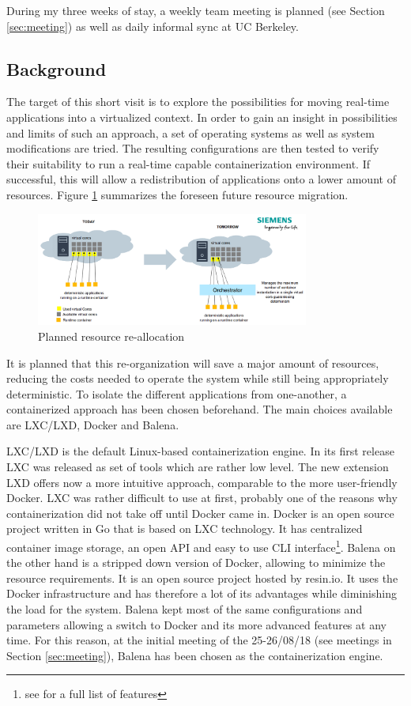 \documentclass[]{scrartcl}
\begin{document}
During my three weeks of stay, a weekly team meeting is planned (see Section \ref{sec:meeting}) as well as daily informal sync at UC Berkeley.

\subsection{Background}

The target of this short visit is to explore the possibilities for moving real-time applications into a virtualized context. In order to gain an insight in possibilities and limits of such an approach, a set of operating systems as well as system modifications are tried.
The resulting configurations are then tested to verify their suitability to run a real-time capable containerization environment. If successful, this will allow a redistribution of applications onto a lower amount of resources. 
Figure \ref{fig:plan} summarizes the foreseen future resource migration. %

\begin{figure}
	\centering
	\includegraphics[width=0.8\textwidth]{plan}
	\caption{Planned resource re-allocation}
	\label{fig:plan}
\end{figure}

It is planned that this re-organization will save a major amount of resources, reducing the costs needed to operate the system while still being appropriately deterministic. 
To isolate the different applications from one-another, a containerized approach has been chosen beforehand. The main choices available are LXC/LXD, Docker and Balena.

LXC/LXD is the default Linux-based containerization engine. In its first release LXC was released as set of tools which are rather low level. The new extension LXD offers now a more intuitive approach, comparable to the more user-friendly Docker. LXC was rather difficult to use at first, probably one of the reasons why containerization did not take off until Docker came in. Docker is an open source project written in Go that is based on LXC technology. It has centralized container image storage, an open API and easy to use CLI interface\footnote{see \cite{docker01} for a full list of features}. Balena on the other hand is a stripped down version of Docker, allowing to minimize the resource requirements. It is an open source project hosted by resin.io. It uses the Docker infrastructure and has therefore a lot of its advantages while diminishing the load for the system. Balena kept most of the same configurations and parameters allowing a switch to Docker and its more advanced features at any time. For this reason, at the initial meeting of the 25-26/08/18 (see meetings in Section \ref{sec:meeting}), Balena has been chosen as the containerization engine. 
\end{document}
